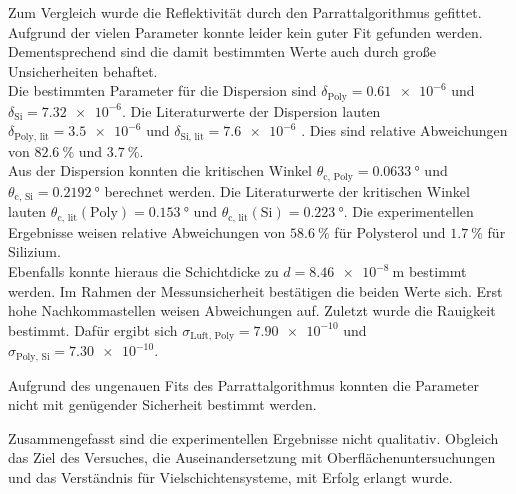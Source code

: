 Zum Vergleich wurde die Reflektivität durch den Parrattalgorithmus gefittet. Aufgrund der vielen Parameter konnte leider kein guter Fit gefunden werden. Dementsprechend 
sind die damit bestimmten Werte auch durch große Unsicherheiten behaftet. \\
Die bestimmten Parameter für die Dispersion sind $\delta_\text{Poly} = \num{0.61e-6}$ und 
$\delta_\text{Si} = \num{7.32e-6}$. Die Literaturwerte der Dispersion lauten $\delta_\text{Poly, lit} = \num{3.5e-6}$ und $\delta_\text{Si, lit} = \num{7.6e-6}$ \cite{V44}.
Dies sind relative Abweichungen von $\qty{82.6}{\percent}$ und $\qty{3.7}{\percent}$. \\
Aus der Dispersion konnten die kritischen Winkel 
$\theta_\text{c, Poly} = \qty{0.0633}{\degree}$ und $\theta_\text{c, Si} = \qty{0.2192}{\degree}$ berechnet werden. Die Literaturwerte der kritischen Winkel lauten 
$\theta_\text{c, lit}(\text{Poly}) =\qty{0.153}{\degree}$ und $\theta_\text{c, lit}(\text{Si}) =\qty{0.223}{\degree}$. Die experimentellen Ergebnisse weisen relative 
Abweichungen von $\qty{58.6}{\percent}$ für Polysterol und $\qty{1.7}{\percent}$ für Silizium. \\
Ebenfalls konnte hieraus die Schichtdicke zu $d = \qty{8.46e-8}{\metre}$
bestimmt werden. Im Rahmen der Messunsicherheit bestätigen die beiden Werte sich. Erst hohe Nachkommastellen weisen Abweichungen auf.
Zuletzt wurde die Rauigkeit bestimmt. Dafür ergibt sich $\sigma_\text{Luft, Poly} = \num{7.90e-10}$ und $\sigma_\text{Poly, Si} = \num{7.30e-10}$.

Aufgrund des ungenauen Fits des Parrattalgorithmus konnten die Parameter nicht mit genügender Sicherheit bestimmt werden. 

Zusammengefasst sind die experimentellen Ergebnisse nicht qualitativ. Obgleich das Ziel des Versuches, die Auseinandersetzung mit Oberflächenuntersuchungen und das Verständnis 
für Vielschichtensysteme, mit Erfolg erlangt wurde. 